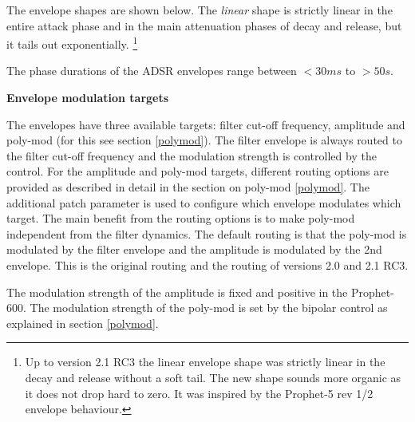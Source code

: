  The envelope shapes are shown below. The \textit{linear} shape is strictly linear in the entire attack phase and in the main attenuation phases of decay and release, but it tails out exponentially. \footnote{Up to version 2.1 RC3 the linear envelope shape was strictly linear in the decay and release without a soft tail. The new shape sounds more organic as it does not drop hard to zero. It was inspired by the Prophet-5 rev 1/2 envelope behaviour.} 
 

The phase durations of the ADSR envelopes range between $<30 ms$ to $>50 s$.

\textbf{Envelope modulation targets}
 
The envelopes have three available targets: filter cut-off frequency, amplitude and poly-mod (for this see section \ref{polymod}). The filter envelope is always routed to the filter cut-off frequency and the modulation strength is controlled by the \filenv control. For the  amplitude and poly-mod targets, different routing options are provided as described in detail in the section on poly-mod \ref{polymod}. The additional patch parameter \envrouting is used to configure which envelope modulates which target. The main benefit from the routing options is to make poly-mod independent from the filter dynamics. The default routing is that the poly-mod is modulated by the filter envelope and the amplitude is modulated by the 2nd envelope. This is the original routing and the routing of versions 2.0 and 2.1 RC3. 

The modulation strength of the amplitude is fixed and positive in the Prophet-600. The modulation strength of the poly-mod is set by the bipolar \polymodenv control as explained in section \ref{polymod}. 
